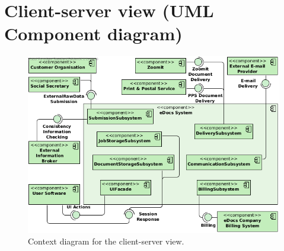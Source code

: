 \section{Client-server view (UML Component diagram)}\label{sec:client-server}

\begin{figure}[!htp]
    \centering
    \includegraphics[width=\textwidth]{figures/Context Diagram 1.png}
    \caption{Context diagram for the client-server view.}\label{fig:cc-context}
\end{figure}

